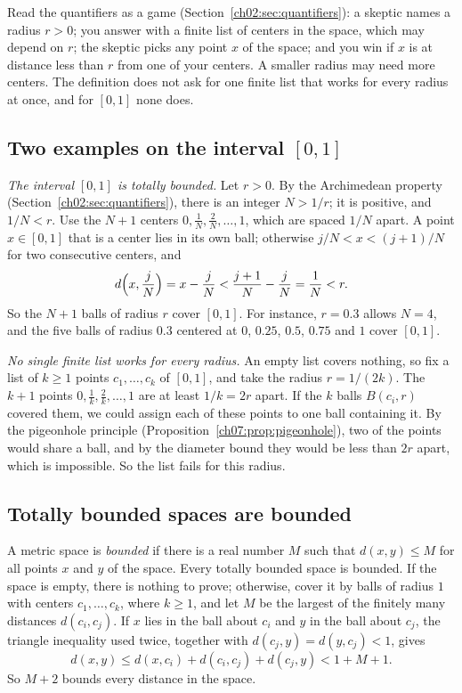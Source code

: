 Read the quantifiers as a game (Section~\ref{ch02:sec:quantifiers}): a skeptic names a radius $r>0$; you answer with a finite list of centers in the space, which may depend on $r$; the skeptic picks any point $x$ of the space; and you win if $x$ is at distance less than $r$ from one of your centers. A smaller radius may need more centers. The definition does not ask for one finite list that works for every radius at once, and for $[0,1]$ none does.

\subsection*{Two examples on the interval $[0,1]$}
\emph{The interval $[0,1]$ is totally bounded.} Let $r>0$. By the Archimedean property (Section~\ref{ch02:sec:quantifiers}), there is an integer $N>1/r$; it is positive, and $1/N<r$. Use the $N+1$ centers $0,\tfrac1N,\tfrac2N,\ldots,1$, which are spaced $1/N$ apart. A point $x\in[0,1]$ that is a center lies in its own ball; otherwise $j/N<x<(j+1)/N$ for two consecutive centers, and
\[
 d\Bigl(x,\frac jN\Bigr)=x-\frac jN<\frac{j+1}N-\frac jN=\frac1N<r.
\]
So the $N+1$ balls of radius $r$ cover $[0,1]$. For instance, $r=0.3$ allows $N=4$, and the five balls of radius $0.3$ centered at $0$, $0.25$, $0.5$, $0.75$ and $1$ cover $[0,1]$.

\emph{No single finite list works for every radius.} An empty list covers nothing, so fix a list of $k\ge1$ points $c_1,\ldots,c_k$ of $[0,1]$, and take the radius $r=1/(2k)$. The $k+1$ points $0,\tfrac1k,\tfrac2k,\ldots,1$ are at least $1/k=2r$ apart. If the $k$ balls $B(c_i,r)$ covered them, we could assign each of these points to one ball containing it. By the pigeonhole principle (Proposition~\ref{ch07:prop:pigeonhole}), two of the points would share a ball, and by the diameter bound they would be less than $2r$ apart, which is impossible. So the list fails for this radius.

\subsection*{Totally bounded spaces are bounded}
A metric space is \emph{bounded} if there is a real number $M$ such that $d(x,y)\le M$ for all points $x$ and $y$ of the space. Every totally bounded space is bounded. If the space is empty, there is nothing to prove; otherwise, cover it by balls of radius $1$ with centers $c_1,\ldots,c_k$, where $k\ge1$, and let $M$ be the largest of the finitely many distances $d(c_i,c_j)$. If $x$ lies in the ball about $c_i$ and $y$ in the ball about $c_j$, the triangle inequality used twice, together with $d(c_j,y)=d(y,c_j)<1$, gives
\[
 d(x,y)\le d(x,c_i)+d(c_i,c_j)+d(c_j,y)<1+M+1.
\]
So $M+2$ bounds every distance in the space.

